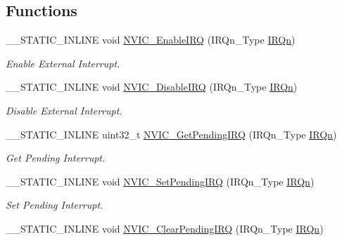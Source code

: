 \subsection*{Functions}
\begin{DoxyCompactItemize}
\item 
\+\_\+\+\_\+\+S\+T\+A\+T\+I\+C\+\_\+\+I\+N\+L\+I\+NE void \hyperlink{group__CMSIS__Core__NVICFunctions_ga3349f2e3580d7ce22d6530b7294e5921}{N\+V\+I\+C\+\_\+\+Enable\+I\+RQ} (I\+R\+Qn\+\_\+\+Type \hyperlink{group__Interrupt__vector__numbers_ga666eb0caeb12ec0e281415592ae89083}{I\+R\+Qn})
\begin{DoxyCompactList}\small\item\em Enable External Interrupt. \end{DoxyCompactList}\item 
\+\_\+\+\_\+\+S\+T\+A\+T\+I\+C\+\_\+\+I\+N\+L\+I\+NE void \hyperlink{group__CMSIS__Core__NVICFunctions_ga260fba04ac8346855c57f091d4ee1e71}{N\+V\+I\+C\+\_\+\+Disable\+I\+RQ} (I\+R\+Qn\+\_\+\+Type \hyperlink{group__Interrupt__vector__numbers_ga666eb0caeb12ec0e281415592ae89083}{I\+R\+Qn})
\begin{DoxyCompactList}\small\item\em Disable External Interrupt. \end{DoxyCompactList}\item 
\+\_\+\+\_\+\+S\+T\+A\+T\+I\+C\+\_\+\+I\+N\+L\+I\+NE uint32\+\_\+t \hyperlink{group__CMSIS__Core__NVICFunctions_gafec8042db64c0f8ed432b6c8386a05d8}{N\+V\+I\+C\+\_\+\+Get\+Pending\+I\+RQ} (I\+R\+Qn\+\_\+\+Type \hyperlink{group__Interrupt__vector__numbers_ga666eb0caeb12ec0e281415592ae89083}{I\+R\+Qn})
\begin{DoxyCompactList}\small\item\em Get Pending Interrupt. \end{DoxyCompactList}\item 
\+\_\+\+\_\+\+S\+T\+A\+T\+I\+C\+\_\+\+I\+N\+L\+I\+NE void \hyperlink{group__CMSIS__Core__NVICFunctions_ga3ecf446519da33e1690deffbf5be505f}{N\+V\+I\+C\+\_\+\+Set\+Pending\+I\+RQ} (I\+R\+Qn\+\_\+\+Type \hyperlink{group__Interrupt__vector__numbers_ga666eb0caeb12ec0e281415592ae89083}{I\+R\+Qn})
\begin{DoxyCompactList}\small\item\em Set Pending Interrupt. \end{DoxyCompactList}\item 
\+\_\+\+\_\+\+S\+T\+A\+T\+I\+C\+\_\+\+I\+N\+L\+I\+NE void \hyperlink{group__CMSIS__Core__NVICFunctions_ga332e10ef9605dc6eb10b9e14511930f8}{N\+V\+I\+C\+\_\+\+Clear\+Pending\+I\+RQ} (I\+R\+Qn\+\_\+\+Type \hyperlink{group__Interrupt__vector__numbers_ga666eb0caeb12ec0e281415592ae89083}{I\+R\+Qn})

\end{DoxyCompactItemize}

